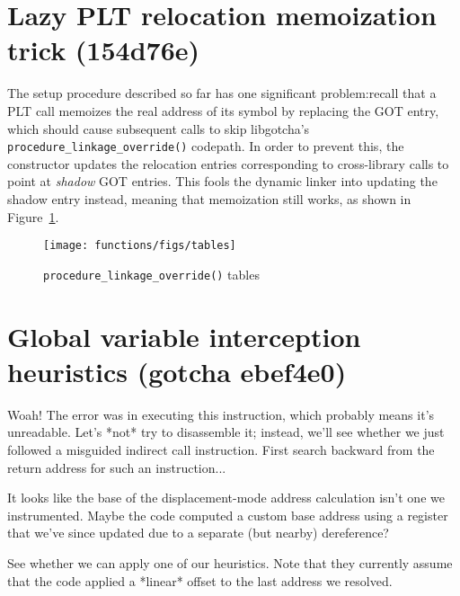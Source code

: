 \documentclass[12pt,letterpaper,openright]{report}
\makeatletter
\let\includegraphics@\includegraphics
\renewcommand{\includegraphics}[2][]{\includegraphics@[#1]{\includegraphicsdir#2}}
\newcommand{\includegraphicsdir}{}
\makeatother
\begin{document}
\section{Lazy PLT relocation memoization trick (154d76e)}

The setup procedure described so far has one significant problem:\@ recall that a PLT
call memoizes the real address of its symbol by replacing the GOT entry, which should
cause subsequent calls to skip libgotcha's \texttt{procedure\_linkage\_override()}
codepath.  In order to prevent this, the constructor updates the relocation entries
corresponding to cross-library calls to point at \textit{shadow} GOT entries.  This
fools the dynamic linker into updating the shadow entry instead, meaning that
memoization still works, as shown in Figure~\ref{fig:override}.

\begin{figure}
\texttt{[image: functions/figs/tables]}
\caption{\texttt{procedure\_linkage\_override()} tables}
\label{fig:override}
\end{figure}


\section{Global variable interception heuristics (gotcha ebef4e0)}

Woah!  The error was in executing this instruction, which probably means it's
unreadable.  Let's *not* try to disassemble it; instead, we'll see whether we
just followed a misguided indirect call instruction.  First search backward from
the return address for such an instruction...

It looks like the base of the displacement-mode address calculation isn't one we
instrumented.  Maybe the code computed a custom base address using a register
that we've since updated due to a separate (but nearby) dereference?

See whether we can apply one of our heuristics.  Note that they currently assume
that the code applied a *linear* offset to the last address we resolved.
\end{document}
